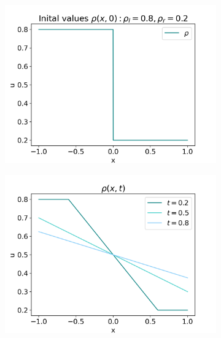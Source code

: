 \documentclass[10pt]{article}
\numberwithin{equation}{section}
\begin{document}
\begin{figure}
     \centering
     \begin{subfigure}[b]{0.3\textwidth}
         \centering
         \includegraphics[width=\textwidth]{Figures/Model/Plots/RarefacIV.png}
     \end{subfigure}
     \hfill
     \begin{subfigure}[b]{0.3\textwidth}
         \centering
         \includegraphics[width=\textwidth]{Figures/Model/Plots/RarefacAtTime.png}
     \end{subfigure}

\end{figure}
\end{document}
